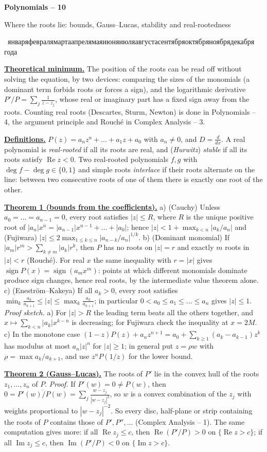 \documentclass[11pt,a4paper]{article}
\newcommand{\head}[1]{\par\medskip\noindent\textbf{\underline{#1}}\quad}
\newcommand{\rudate}{\number\day~\ifcase\month\or января\or февраля\or марта\or апреля\or мая\or июня\or июля\or августа\or сентября\or октября\or ноября\or декабря\fi~\number\year~года}
\newcommand{\sheettitle}[3]{%
  \begin{center}
  {\huge\bfseries #1\par}\vspace{1.2em}
  {\Large #2\par}\vspace{0.8em}
  \if\relax\detokenize{#3}\relax\else{\Large #3\par}\vspace{0.8em}\fi
  {\foreignlanguage{russian}{\rudate}\par}
  \end{center}\vspace{0.5em}}
\begin{document}
\sheettitle{Polynomials -- 10}{Where the roots lie: bounds, Gauss--Lucas, stability and real-rootedness}{}

\head{Theoretical minimum.} The position of the roots can be read off without solving the
equation, by two devices: comparing the sizes of the monomials (a dominant term forbids roots or
forces a sign), and the logarithmic derivative $P'/P=\sum_j\frac1{z-z_j}$, whose real or imaginary
part has a fixed sign away from the roots. Counting real roots (Descartes, Sturm, Newton) is done in
Polynomials -- 4, the argument principle and Rouch\'e in Complex Analysis -- 3.

\head{Definitions.} $P(z)=a_nz^n+\dots+a_1z+a_0$ with $a_n\neq0$, and $D=\frac{d}{dx}$. A real
polynomial is \emph{real-rooted} if all its roots are real, and (\emph{Hurwitz}) \emph{stable} if
all its roots satisfy $\operatorname{Re}z<0$. Two real-rooted polynomials $f,g$ with
$\deg f-\deg g\in\{0,1\}$ and simple roots \emph{interlace} if their roots alternate on the line:
between two consecutive roots of one of them there is exactly one root of the other.

\head{Theorem 1 (bounds from the coefficients).} a) (Cauchy) Unless $a_0=\dots=a_{n-1}=0$, every root satisfies $|z|\le R$, where $R$ is the unique positive root of
$|a_n|x^n=|a_{n-1}|x^{n-1}+\dots+|a_0|$; hence $|z|<1+\max_{k<n}|a_k/a_n|$ and (Fujiwara)
$|z|\le2\max_{1\le k\le n}|a_{n-k}/a_n|^{1/k}$.
b) (Dominant monomial) If $|a_m|r^m>\sum_{k\neq m}|a_k|r^k$, then $P$ has no roots on $|z|=r$ and
exactly $m$ roots in $|z|<r$ (Rouch\'e). For real $x$ the same inequality with $r=|x|$ gives
$\operatorname{sign}P(x)=\operatorname{sign}(a_mx^m)$: points at which different monomials dominate
produce sign changes, hence real roots, by the intermediate value theorem alone.
c) (Enestr\"om--Kakeya) If all $a_k>0$, every root satisfies
$\min_k\frac{a_k}{a_{k+1}}\le|z|\le\max_k\frac{a_k}{a_{k+1}}$; in particular
$0<a_0\le a_1\le\dots\le a_n$ gives $|z|\le1$.
\emph{Proof sketch.} a) For $|z|>R$ the leading term beats all the others together, and
$x\mapsto\sum_{k<n}|a_k|x^{k-n}$ is decreasing; for Fujiwara check the inequality at $x=2M$.
c) In the monotone case $(1-z)P(z)+a_nz^{n+1}=a_0+\sum_{k\ge1}(a_k-a_{k-1})z^k$ has modulus at
most $a_n|z|^n$ for $|z|\ge1$; in general put $z=\rho w$ with $\rho=\max a_k/a_{k+1}$, and use
$z^nP(1/z)$ for the lower bound.

\head{Theorem 2 (Gauss--Lucas).} The roots of $P'$ lie in the convex hull of the roots
$z_1,\dots,z_n$ of $P$. \emph{Proof.} If $P'(w)=0\neq P(w)$, then
$0=\overline{P'(w)/P(w)}=\sum_j\frac{w-z_j}{|w-z_j|^2}$, so $w$ is a convex combination of the $z_j$
with weights proportional to $|w-z_j|^{-2}$. So every disc, half-plane or strip containing the roots
of $P$ contains those of $P',P'',\dots$ (Complex Analysis -- 1). The same computation gives more:
if all $\operatorname{Re}z_j\le c$, then $\operatorname{Re}(P'/P)>0$ on $\{\operatorname{Re}z>c\}$;
if all $\operatorname{Im}z_j\le c$, then $\operatorname{Im}(P'/P)<0$ on $\{\operatorname{Im}z>c\}$.
\end{document}
